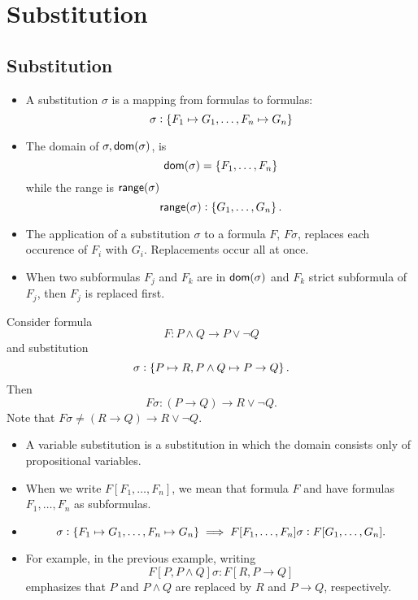 \section{Substitution}
\begin{center}

\end{center}
\subsection{Substitution}
\begin{itemize}
	\item A substitution $\sigma$ is a mapping from formulas to formulas: \[
	\sigma:\set{F_1\mapsto G_1,\dots, F_n\mapsto G_n}
	\]
	\item The domain of $\sigma, \mathsf{dom}(\sigma)$, is \[
	\mathsf{dom}(\sigma)=\set{F_1,\dots,F_n}
	\] while the range is $\mathsf{range}(\sigma)$ \[
	\mathsf{range}(\sigma):\set{G_1,\dots,G_n}.
	\]
	\item The application of a substitution $\sigma$ to a formula $F$, $F\sigma$, replaces each occurence of $F_i$ with $G_i$. Replacements occur all at once.
	\item When two subformulas $F_j$ and $F_k$ are in $\mathsf{dom}(\sigma)$ and $F_k$ strict subformula of $F_j$, then $F_j$ is replaced first.
\end{itemize}

\begin{example}
Consider formula \[
F:P\land Q\to P\lor\lnot Q
\] and substitution \[
\sigma:\set{P\mapsto R,P\land Q\mapsto P\to Q}.
\] Then \[
F\sigma:(P\to Q)\to R\lor\lnot Q.
\] Note that $F\sigma\neq(R\to Q)\to R\lor\lnot Q$.
\begin{center}

\end{center}
\end{example}

\begin{itemize}
	\item A variable substitution is a substitution in which the domain consists only of propositional variables.
	\item When we write $F[F_1,\dots,F_n]$, we mean that formula $F$ and have formulas $F_1,\dots,F_n$ as subformulas.
	\item \[
	\sigma:\set{F_1\mapsto G_1,\dots,F_n\mapsto G_n}\implies F[F_1,\dots,F_n]\sigma:F[G_1,\dots, G_n].
	\]
	\item For example, in the previous example, writing \[
	F[P,P\land Q]\sigma:F[R,P\to Q]
	\] emphasizes that $P$ and $P\land Q$ are replaced by $R$ and $P\to Q$, respectively.
\end{itemize}

